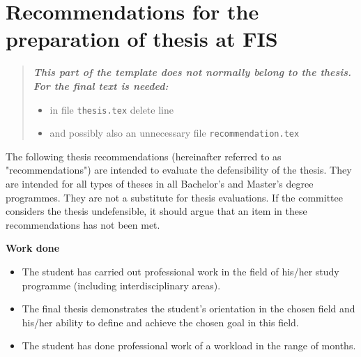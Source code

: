 \chapter*{Recommendations for the preparation of thesis at FIS}

\begin{quote}
\bfseries\itshape
This part of the template does not normally belong to the thesis. For the final
text is needed:
\begin{itemize}
\item in file \verb|thesis.tex| delete line \verb||
\item and possibly also an unnecessary file \verb|recommendation.tex|
\end{itemize}
\end{quote}

The following thesis recommendations (hereinafter referred to as 
"recommendations") are intended to evaluate the defensibility of the thesis. 
They are intended for all types of theses in all Bachelor's and Master's degree 
programmes. They are not a substitute for thesis evaluations. If the committee 
considers the thesis undefensible, it should argue that an item in these 
recommendations has not been met.

{\bfseries\sffamily\Large Work done}
\begin{itemize}
\item \vspace*{-2ex}The student has carried out professional work in the field of his/her study programme (including interdisciplinary areas).
\item The final thesis demonstrates the student's orientation in the chosen field and his/her ability to define and achieve the chosen goal in this field. 
\item The student has done professional work of a workload in the range of months.
\end{itemize}

